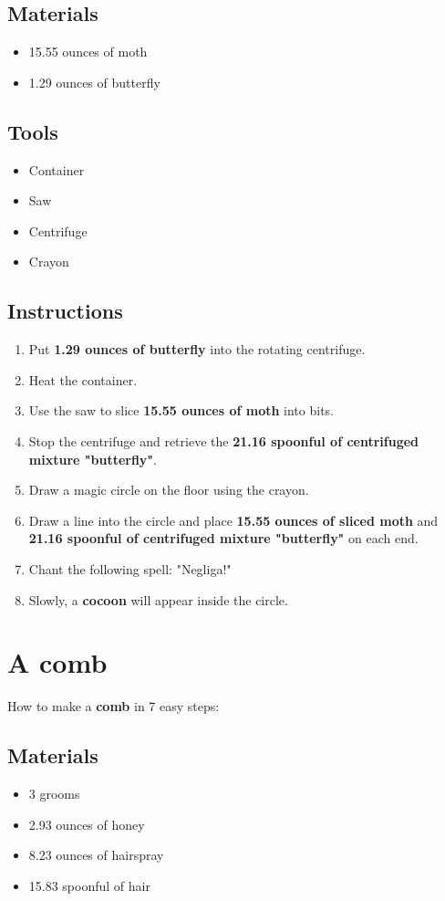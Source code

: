\documentclass{article}
\begin{document}
\subsection{Materials}\begin{itemize}
\item 
15.55 ounces of moth
\item 
1.29 ounces of butterfly
\end{itemize}
\subsection{Tools}\begin{itemize}
\item 
Container
\item 
Saw
\item 
Centrifuge
\item 
Crayon
\end{itemize}
\subsection{Instructions}\begin{enumerate}
\item 
Put \textbf{1.29 ounces of butterfly} into the rotating centrifuge.
\item 
Heat the container.
\item 
Use the saw to slice \textbf{15.55 ounces of moth} into bits.
\item 
Stop the centrifuge and retrieve the \textbf{21.16 spoonful of centrifuged mixture "butterfly"}.
\item 
Draw a magic circle on the floor using the crayon.
\item 
Draw a line into the circle and place \textbf{15.55 ounces of sliced moth} and \textbf{21.16 spoonful of centrifuged mixture "butterfly"} on each end.
\item 
Chant the following spell: "Negliga!"
\item 
Slowly, a \textbf{cocoon} will appear inside the circle.
\end{enumerate}
\newpage
\section{A comb}How to make a \textbf{comb} in 7 easy steps:

\subsection{Materials}\begin{itemize}
\item 
3 grooms
\item 
2.93 ounces of honey
\item 
8.23 ounces of hairspray
\item 
15.83 spoonful of hair
\end{itemize}
\end{document}
